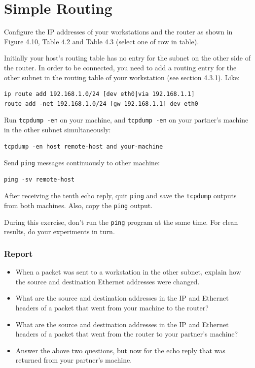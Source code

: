 \documentclass{../UTNetLab}
\begin{document}
\section{Simple Routing}
    Configure the IP addresses of your workstations and the router as shown in Figure 4.10, Table 4.2 and Table 4.3 (select one of row in table).

    Initially your host’s routing table has no entry for the subnet on the other side of the router.
    In order to be connected, you need to add a routing entry for the other subnet in the routing table of your workstation (see section 4.3.1).
    Like:
    \begin{lstlisting}
ip route add 192.168.1.0/24 [dev eth0|via 192.168.1.1]
route add -net 192.168.1.0/24 [gw 192.168.1.1] dev eth0
    \end{lstlisting}

    Run \lstinline{tcpdump -en} on your machine, and \lstinline{tcpdump -en} on your partner’s machine in the other subnet simultaneously:
    \begin{lstlisting}[emph={your-host, remote-host}]
tcpdump -en host remote-host and your-machine
    \end{lstlisting}
    Send \lstinline{ping} messages continuously to other machine:
    \begin{lstlisting}[emph={your-host, remote-host}]
ping -sv remote-host
    \end{lstlisting}
    After receiving the tenth echo reply, quit \lstinline{ping} and save the \lstinline{tcpdump} outputs from both machines.
    Also, copy the \lstinline{ping} output.

    During this exercise, don’t run the \lstinline{ping} program at the same time.
    For clean results, do your experiments in turn.
    
    \subsubsection*{Report}
    \begin{itemize}
        \item When a packet was sent to a workstation in the other subnet, explain how the source and destination Ethernet addresses were changed.
        \item What are the source and destination addresses in the IP and Ethernet headers of a packet that went from your machine to the router?
        \item What are the source and destination addresses in the IP and Ethernet headers of a packet that went from the router to your partner’s machine?
        \item Answer the above two questions, but now for the echo reply that was returned from your partner’s machine.
    \end{itemize}
    
\end{document}
